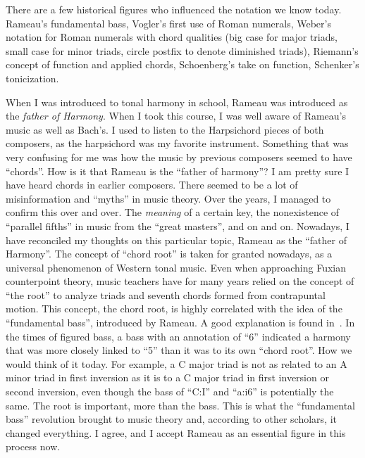There are a few historical figures who influenced the notation we know today.
Rameau's fundamental bass, Vogler's first use of Roman numerals, Weber's notation for Roman numerals with chord qualities (big case for major triads, small case for minor triads, circle postfix to denote diminished triads), Riemann's concept of function and applied chords, Schoenberg's take on function, Schenker's tonicization.

When I was introduced to tonal harmony in school, Rameau was introduced as the \emph{father of Harmony}.
When I took this course, I was well aware of Rameau's music as well as Bach's.
I used to listen to the Harpsichord pieces of both composers, as the harpsichord was my favorite instrument.
Something that was very confusing for me was how the music by previous composers seemed to have ``chords''.
How is it that Rameau is the ``father of harmony''? I am pretty sure I have heard chords in earlier composers.
There seemed to be a lot of misinformation and ``myths'' in music theory.
Over the years, I managed to confirm this over and over.
The \emph{meaning} of a certain key, the nonexistence of ``parallel fifths'' in music from the ``great masters'', and on and on.
Nowadays, I have reconciled my thoughts on this particular topic, Rameau as the ``father of Harmony''.
The concept of ``chord root'' is taken for granted nowadays, as a universal phenomenon of Western tonal music.
Even when approaching Fuxian counterpoint theory, music teachers have for many years relied on the concept of ``the root'' to analyze triads and seventh chords formed from contrapuntal motion.
This concept, the chord root, is highly correlated with the idea of the ``fundamental bass'', introduced by Rameau.
A good explanation is found in~\textcite{christensen_rameau_2002}.
In the times of figured bass, a bass with an annotation of ``6'' indicated a harmony that was more closely linked to ``5'' than it was to its own ``chord root''.
How we would think of it today.
For example, a C major triad is not as related to an A minor triad in first inversion as it is to a C major triad in first inversion or second inversion, even though the bass of ``C:I'' and ``a:i6'' is potentially the same.
The root is important, more than the bass.
This is what the ``fundamental bass'' revolution brought to music theory and, according to other scholars, it changed everything.
I agree, and I accept Rameau as an essential figure in this process now.


